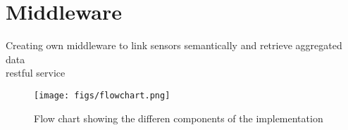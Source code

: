 \section{Middleware}
Creating own middleware to link sensors semantically and retrieve aggregated data\\

\ac{rest}ful service

\begin{figure}
	\centering
	\texttt{[image: figs/flowchart.png]}
	\caption{Flow chart showing the differen components of the implementation}
	\label{fig:Flowchart}
\end{figure}
\fi




